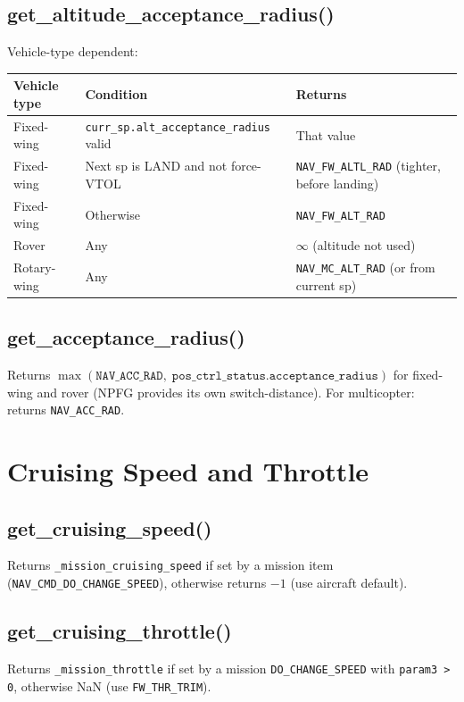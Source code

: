 \documentclass[12pt,a4paper]{article}
\begin{document}
\subsection{get\_altitude\_acceptance\_radius()}

Vehicle-type dependent:
\begin{center}\begin{tabular}{lll}\toprule
Vehicle type & Condition & Returns \\\midrule
Fixed-wing & \texttt{curr\_sp.alt\_acceptance\_radius} valid & That value \\
Fixed-wing & Next sp is LAND and not force-VTOL & \texttt{NAV\_FW\_ALTL\_RAD} (tighter, before landing) \\
Fixed-wing & Otherwise & \texttt{NAV\_FW\_ALT\_RAD} \\
Rover & Any & $\infty$ (altitude not used) \\
Rotary-wing & Any & \texttt{NAV\_MC\_ALT\_RAD} (or from current sp) \\
\bottomrule\end{tabular}\end{center}

\subsection{get\_acceptance\_radius()}
Returns $\max(\texttt{NAV\_ACC\_RAD},\; \texttt{pos\_ctrl\_status.acceptance\_radius})$
for fixed-wing and rover (NPFG provides its own switch-distance).
For multicopter: returns \texttt{NAV\_ACC\_RAD}.

\section{Cruising Speed and Throttle}

\subsection{get\_cruising\_speed()}
Returns \texttt{\_mission\_cruising\_speed} if set by a mission item
(\texttt{NAV\_CMD\_DO\_CHANGE\_SPEED}), otherwise returns $-1$ (use aircraft default).

\subsection{get\_cruising\_throttle()}
Returns \texttt{\_mission\_throttle} if set by a mission
\texttt{DO\_CHANGE\_SPEED} with \texttt{param3 > 0}, otherwise NaN
(use \texttt{FW\_THR\_TRIM}).
\end{document}
